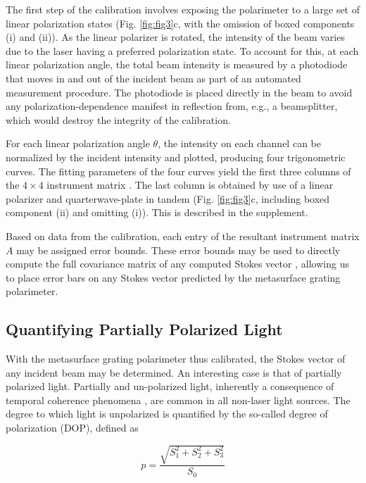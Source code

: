 \documentclass[footinbib,aps,prl,twocolumn,superscriptaddress]{revtex4-1}
\begin{document}
The first step of the calibration involves exposing the polarimeter to a large set of linear polarization states (Fig. \ref{fig:fig3}c, with the omission of boxed components (i) and (ii)). As the linear polarizer is rotated, the intensity of the beam varies due to the laser having a preferred polarization state. To account for this, at each linear polarization angle, the total beam intensity is measured by a photodiode that moves in and out of the incident beam as part of an automated measurement procedure. The photodiode is placed directly in the beam to avoid any polarization-dependence manifest in reflection from, e.g., a beamsplitter, which would destroy the integrity of the calibration.

For each linear polarization angle $\theta$, the intensity on each channel can be normalized by the incident intensity and plotted, producing four trigonometric curves. The fitting parameters of the four curves yield the first three columns of the $4\times4$ instrument matrix \cite{Azzam1989}. The last column is obtained by use of a linear polarizer and quarterwave-plate in tandem (Fig. \ref{fig:fig3}c, including boxed component (ii) and omitting (i)). This is described in the supplement.

Based on data from the calibration, each entry of the resultant instrument matrix $A$ may be assigned error bounds. These error bounds may be used to directly compute the full covariance matrix of any computed Stokes vector \cite{AsensioRamos2008}, allowing us to place error bars on any Stokes vector predicted by the metasurface grating polarimeter.

\subsection{Quantifying Partially Polarized Light}

With the metasurface grating polarimeter thus calibrated, the Stokes vector of any incident beam may be determined. An interesting case is that of partially polarized light. Partially and un-polarized light, inherently a consequence of temporal coherence phenomena \cite{Wolf2007, Damask2005}, are common in all non-laser light sources. The degree to which light is unpolarized is quantified by the so-called degree of polarization (DOP), defined as

\begin{equation}
	\label{DOP}
	p = \frac{\sqrt{S_1^2+S_2^2+S_3^2}}{S_0}
\end{equation} 
\end{document}
